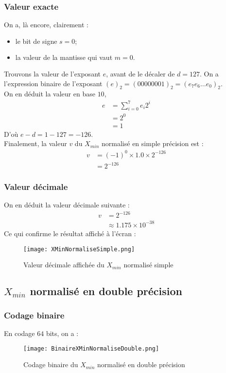 \documentclass[a4paper, titlepage]{livret} %
\begin{document}
				\subsubsection{Valeur exacte}
					On a, là encore, clairement : 
					\begin{itemize}
						\item le bit de signe $s = 0$;
						\item la valeur de la mantisse qui vaut $m = 0$.
					\end{itemize}
					Trouvons la valeur de l'exposant $e$, avant de le décaler de $d = 127$.
					On a l'expression binaire de l'exposant $(e)_{2} = (00000001)_{2} = (e_{7}e_{6}…e_{0})_{2}$.\\
					On en déduit la valeur en base $10$, 
					\[\begin{aligned}
						e & = \sum_{i=0}^{7} e_{i}2^{i}\\
						  & = 2^{0}\\
						  & = 1
					\end{aligned}\]
					D'où $e-d = 1 - 127 = -126$.\\
					Finalement, la valeur $v$ du $X_{min}$ normalisé en simple précision est :
					\[\begin{aligned}
						v & = (-1)^{0} \times 1.0 \times 2^{-126}\\
						  & = 2^{-126}
					\end{aligned}\]

				\subsubsection{Valeur décimale}
					On en déduit la valeur décimale suivante :
					\[\begin{aligned}
						v & = 2^{-126}\\
						  & \approx 1.175 \times 10^{-38}
					\end{aligned}\]
					Ce qui confirme le résultat affiché à l'écran :
					\begin{figure}[!h]
						\centering
  							\texttt{[image: XMinNormaliseSimple.png]}
  							\caption{Valeur décimale affichée du $X_{min}$ normalisé simple}
					\end{figure}

			\subsection{$X_{min}$ normalisé en double précision}
				\subsubsection{Codage binaire}
					En codage $64$ bits, on a :
					\begin{figure}[!h]
						\centering
  							\texttt{[image: BinaireXMinNormaliseDouble.png]}
  							\caption{Codage binaire du $X_{min}$ normalisé en double précision}
					\end{figure}
	
\end{document}

